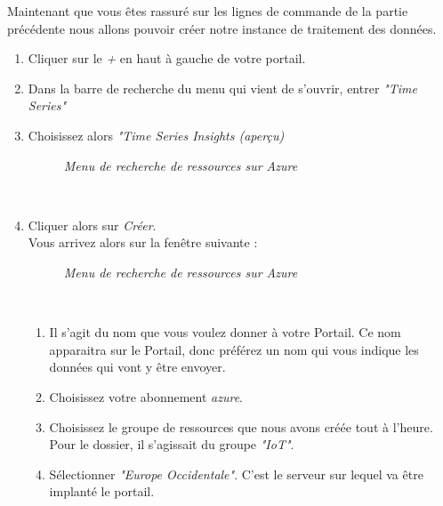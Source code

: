 Maintenant que vous êtes rassuré sur les lignes de commande de la partie précédente nous allons pouvoir créer notre instance de traitement des données.\\
\begin{enumerate}
	\item Cliquer sur le \textit{+} en haut à gauche de votre portail.
	\item Dans la barre de recherche du menu qui vient de s'ouvrir, entrer \textit{"Time Series"}
	\item Choisissez alors \textit{"Time Series Insights (aperçu)}
	
\begin{figure}[H]
\begin{center}
\end{center}
	\caption{ \textit{Menu de recherche de ressources sur Azure}}
\end{figure}\\

	\item Cliquer alors sur \textit{Créer}.\\
Vous arrivez alors sur la fenêtre  suivante :\\

\begin{figure}[H]
\begin{center}
\end{center}
	\caption{ \textit{Menu de recherche de ressources sur Azure}}
\end{figure}\\

\begin{enumerate}

	\item Il s'agit du nom que vous voulez donner à votre Portail. Ce nom apparaitra sur le Portail, donc préférez un nom qui vous indique les données qui vont y être envoyer.
	
	\item Choisissez votre abonnement \textit{azure}.
	
	\item Choisissez le groupe de ressources que nous avons créée tout à l'heure. Pour le dossier, il s'agissait du groupe \textit{"IoT"}.
	\item Sélectionner \textit{"Europe Occidentale"}. C'est le serveur sur lequel va être implanté le portail.
	

\end{enumerate}
\end{enumerate}
